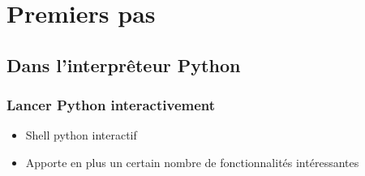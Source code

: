 \section{Premiers pas}

\subsection{Dans l'interprêteur Python}
\begin{frame}[fragile]
  \frametitle{Lancer Python interactivement}
  \begin{itemize}
    \item Shell python interactif
    \item Apporte en plus un certain nombre de fonctionnalités intéressantes
  \end{itemize}
\end{frame}

